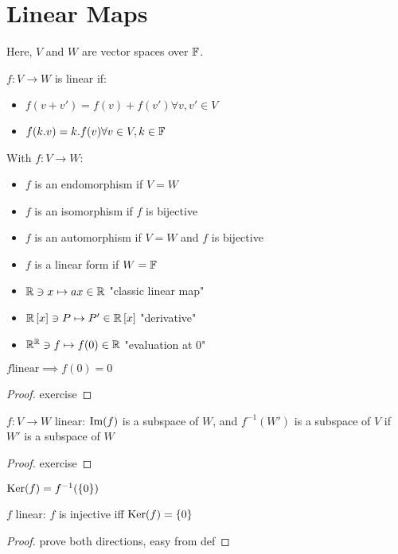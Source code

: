 \section{Linear Maps}
Here, $V$ and $W$ are vector spaces over $\mathbb{F}$.
\begin{definition}
	$f: V \to W$ is linear if:
	\begin{itemize}
		\item $f(v+v')=f(v)+f(v') \forall v,v' \in V$
		\item $f(k.v)=k.f(v) \forall v \in V, k \in \mathbb{F}$
	\end{itemize}
\end{definition}
\begin{definition}
	With $f: V \to W$:
	\begin{itemize}
		\item $f$ is an endomorphism if $V=W$
		\item $f$ is an isomorphism if $f$ is bijective
		\item $f$ is an automorphism if $V=W$ and $f$ is bijective
		\item $f$ is a linear form if $W=\mathbb{F}$
	\end{itemize}
\end{definition}
\begin{example}
	\begin{itemize}
		\item $\mathbb{R} \ni x \mapsto ax \in \mathbb{R}$ "classic linear map"
		\item $\mathbb{R}\left[ x \right] \ni P \mapsto P' \in \mathbb{R}\left[ x \right]$ "derivative"
		\item $\mathbb{R}^{\mathbb{R}} \ni f \mapsto f(0) \in \mathbb{R}$ "evaluation at 0"
	\end{itemize}
\end{example}
\begin{property}
	$f \text{linear} \implies f(0)=0$
\end{property}
\begin{proof}
	exercise
\end{proof}
\begin{property}
	$f: V \to W$ linear: $\text{Im}(f)$ is a subspace of $W$, and $f^{-1}(W')$ is a subspace of $V$ if $W'$ is a subspace of $W$
\end{property}
\begin{proof}
	exercise
\end{proof}

\begin{definition}[Kernel]
	$\text{Ker}(f)=f^{-1}(\{0\})$
\end{definition}
\begin{property}
	$f$ linear: $f$ is injective iff $\text{Ker}(f)=\{0\}$
\end{property}
\begin{proof}
	prove both directions, easy from def
\end{proof}

